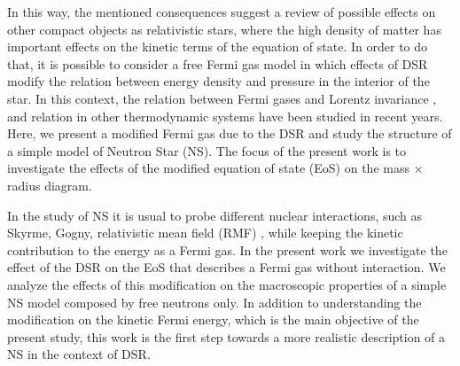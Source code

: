 \documentclass[final,5p,times,twocolumn]{elsarticle}
\begin{document}
In this way, the mentioned consequences suggest a review of possible effects on other compact objects as relativistic stars, where the high density of matter has important effects on the kinetic terms of the equation of state. In order to do that, it is possible to consider a free Fermi gas model in which effects of DSR modify the relation between energy density and pressure in the interior of the star. In this context, the relation between Fermi gases and Lorentz invariance \cite{camacho2006white,gregg2009modified,bertolami2010towards,amelino2012uv,mishra2018invariant}, and  relation in other thermodynamic systems \cite{camacho2007thermodynamics,zhang2011photon,chandra2012thermodynamics,mishra2017equilibrium} have been studied in recent years. Here, we present a modified Fermi gas due to the DSR and study the structure of a simple model of Neutron Star (NS).  The focus of the present work is to investigate the effects of the modified equation of state (EoS) on the mass $\times$ radius diagram.   


In the study of NS it is usual to probe different nuclear interactions, such as Skyrme, Gogny, relativistic mean field (RMF) \cite{Chabanat1997,Lourenco2020,GONZALEZBOQUERA2018195,PhysRevC.82.055803,PhysRevC.99.045202,tm1}, while keeping the kinetic contribution to the energy as a Fermi gas. In the present work we investigate the effect of the DSR on the EoS that describes a Fermi gas without interaction. We analyze the effects of this modification on the macroscopic properties of a simple NS model composed by free neutrons only. In addition to understanding the modification on the kinetic Fermi energy, which is the main objective of the present study, this work is the first step towards a more realistic description of a NS in the context of DSR.
\end{document}

